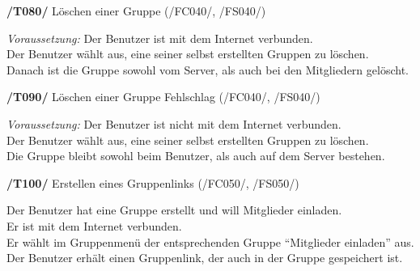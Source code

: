 \textbf{/T080/} Löschen einer Gruppe (/FC040/, /FS040/)\\
\begin{center}
\vspace{-\parskip}
\begin{minipage}[t]{0.9\textwidth}
\emph{Voraussetzung:} Der Benutzer ist mit dem Internet verbunden.                     \\
Der Benutzer wählt aus, eine seiner selbst erstellten Gruppen zu löschen.        \\
Danach ist die Gruppe sowohl vom Server, als auch bei den Mitgliedern gelöscht.   \\
\end{minipage}
\end{center}

\textbf{/T090/} Löschen einer Gruppe Fehlschlag (/FC040/, /FS040/)\\
\begin{center}
\vspace{-\parskip}
\begin{minipage}[t]{0.9\textwidth}
\emph{Voraussetzung:} Der Benutzer ist nicht mit dem Internet verbunden.                 \\
Der Benutzer wählt aus, eine seiner selbst erstellten Gruppen zu löschen.          \\
Die Gruppe bleibt sowohl beim Benutzer, als auch auf dem Server bestehen.           \\
\end{minipage}
\end{center}

\textbf{/T100/} Erstellen eines Gruppenlinks (/FC050/, /FS050/)\\
\begin{center}
\vspace{-\parskip}
\begin{minipage}[t]{0.9\textwidth}
Der Benutzer hat eine Gruppe erstellt und will Mitglieder einladen.      \\
Er ist mit dem Internet verbunden.                                        \\
Er wählt im Gruppenmenü der entsprechenden Gruppe "`Mitglieder einladen"' aus. \\
Der Benutzer erhält einen Gruppenlink, der auch in der Gruppe gespeichert ist.\\
\end{minipage}
\end{center}

